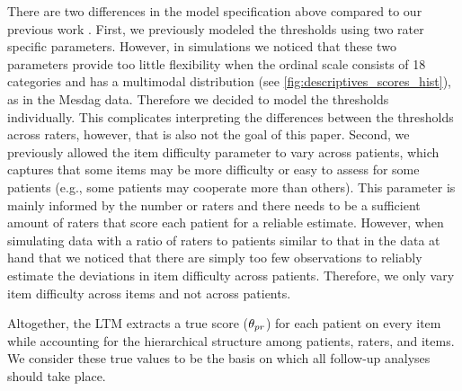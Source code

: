 \documentclass[a4paper,11pt]{article}
\newcommand{\DB}[1]{\todo[inline, color=colorDon]{DB: {#1}}}
\begin{document}
There are two differences in the model specification above compared to our previous work \parencite{vandenBergh2020cultural}.
First, we previously modeled the thresholds using two rater specific parameters.
However, in simulations we noticed that these two parameters provide too little flexibility when the ordinal scale consists of 18 categories and has a multimodal distribution (see \autoref{fig:descriptives_scores_hist}), as in the Mesdag data.
Therefore we decided to model the thresholds individually.
This complicates interpreting the differences between the thresholds across raters, however, that is also not the goal of this paper.
Second, we previously allowed the item difficulty parameter to vary across patients, which captures that some items may be more difficulty or easy to assess for some patients (e.g., some patients may cooperate more than others).
This parameter is mainly informed by the number or raters and there needs to be a sufficient amount of raters that score each patient for a reliable estimate.
However, when simulating data with a ratio of raters to patients similar to that in the data at hand that we noticed that there are simply too few observations to reliably estimate the deviations in item difficulty across patients.
Therefore, we only vary item difficulty across items and not across patients.

Altogether, the LTM extracts a true score ($\theta_{pr}$) for each patient on every item while accounting for the hierarchical structure among patients, raters, and items.
We consider these true values to be the basis on which all follow-up analyses should take place.%



%
%
%
%
%
\end{document}

